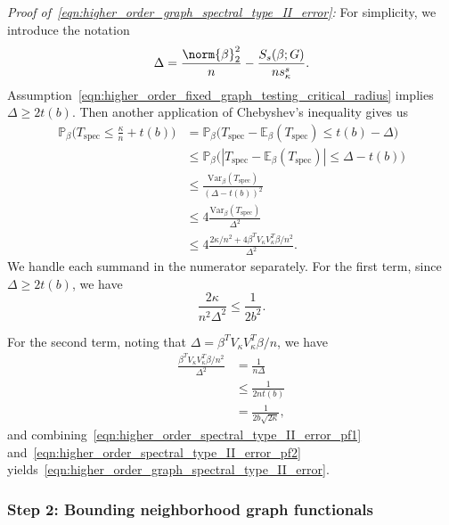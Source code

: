\documentclass{article}
\newcommand{\abs}[1]{\left \lvert #1 \right \rvert}
\newcommand{\Var}{\mathrm{Var}}
\newcommand{\1}{\mathbf{1}}
\newcommand{\Pbb}{\mathbb{P}}
\newcommand{\Ebb}{\mathbb{E}}
\newcommand{\spec}{\mathrm{spec}}
\theoremstyle{alden}
\theoremstyle{aldenthm}
\theoremstyle{definition}
\theoremstyle{remark}
\begin{document}
\vspace{.2 in}

\textit{Proof of~\eqref{eqn:higher_order_graph_spectral_type_II_error}:} For simplicity, we introduce the notation
\begin{equation*}
\Delta = \frac{\norm{\beta}_2^2}{n} - \frac{S_s(\beta;G)}{ns_{\kappa}^s}.
\end{equation*}
Assumption~\eqref{eqn:higher_order_fixed_graph_testing_critical_radius} implies $\Delta \geq 2 t(b)$. Then another application of Chebyshev's inequality gives us
\begin{align*}
\Pbb_{\beta}\bigl(T_{\spec} \leq \frac{\kappa}{n} + t(b)\bigr) & = \Pbb_{\beta}\bigl(T_{\spec} - \Ebb_{\beta}(T_{\spec}) \leq t(b) - \Delta \bigr) \\
& \leq \Pbb_{\beta}\bigl(\abs{T_{\spec} - \Ebb_{\beta}(T_{\spec})} \leq \Delta - t(b) \bigr) \tag{since $\Delta \geq t(b)$}	\\
& \leq \frac{\Var_{\beta}(T_{\spec})}{(\Delta - t(b))^2} \\
& \leq 4\frac{\Var_{\beta}(T_{\spec})}{\Delta^2} \tag{since $\Delta \geq 2t(b)$} \\
& \leq 4\frac{2\kappa/n^2 + 4\beta^T V_{\kappa} V_{\kappa}^T \beta /n^2}{\Delta^2}.
\end{align*}
We handle each summand in the numerator separately. For the first term, since $\Delta \geq 2 t(b)$, we have
\begin{equation}
\label{eqn:higher_order_spectral_type_II_error_pf1}
\frac{2\kappa}{n^2\Delta^2} \leq \frac{1}{2b^2}.
\end{equation}

For the second term, noting that $\Delta = \beta^T V_{\kappa} V_{\kappa}^T \beta/n$, we have
\begin{align}
\frac{\beta^T V_{\kappa} V_{\kappa}^T \beta/n^2}{\Delta^2} & = \frac{1}{n\Delta} \nonumber \\
& \leq \frac{1}{2nt(b)} \nonumber \\
& = \frac{1}{2b\sqrt{2\kappa}}, \label{eqn:higher_order_spectral_type_II_error_pf2}
\end{align}
and combining~\eqref{eqn:higher_order_spectral_type_II_error_pf1} and~\eqref{eqn:higher_order_spectral_type_II_error_pf2} yields~\eqref{eqn:higher_order_graph_spectral_type_II_error}.


\subsubsection{Step 2: Bounding neighborhood graph functionals}
\end{document}
